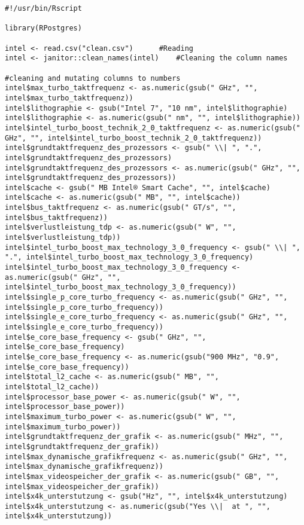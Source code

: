 \begin{lstlisting}[caption={\texttt{database.R}},captionpos=b]
#!/usr/bin/Rscript

library(RPostgres)

intel <- read.csv("clean.csv")		#Reading
intel <- janitor::clean_names(intel)	#Cleaning the column names

#cleaning and mutating columns to numbers
intel$max_turbo_taktfrequenz <- as.numeric(gsub(" GHz", "", intel$max_turbo_taktfrequenz))
intel$lithographie <- gsub("Intel 7", "10 nm", intel$lithographie)
intel$lithographie <- as.numeric(gsub(" nm", "", intel$lithographie))
intel$intel_turbo_boost_technik_2_0_taktfrequenz <- as.numeric(gsub(" GHz", "", intel$intel_turbo_boost_technik_2_0_taktfrequenz))
intel$grundtaktfrequenz_des_prozessors <- gsub(" \\| ", ".", intel$grundtaktfrequenz_des_prozessors)
intel$grundtaktfrequenz_des_prozessors <- as.numeric(gsub(" GHz", "", intel$grundtaktfrequenz_des_prozessors))
intel$cache <- gsub(" MB Intel® Smart Cache", "", intel$cache)
intel$cache <- as.numeric(gsub(" MB", "", intel$cache))
intel$bus_taktfrequenz <- as.numeric(gsub(" GT/s", "", intel$bus_taktfrequenz))
intel$verlustleistung_tdp <- as.numeric(gsub(" W", "", intel$verlustleistung_tdp))
intel$intel_turbo_boost_max_technology_3_0_frequency <- gsub(" \\| ", ".", intel$intel_turbo_boost_max_technology_3_0_frequency)
intel$intel_turbo_boost_max_technology_3_0_frequency <- as.numeric(gsub(" GHz", "", intel$intel_turbo_boost_max_technology_3_0_frequency))
intel$single_p_core_turbo_frequency <- as.numeric(gsub(" GHz", "", intel$single_p_core_turbo_frequency))
intel$single_e_core_turbo_frequency <- as.numeric(gsub(" GHz", "", intel$single_e_core_turbo_frequency))
intel$e_core_base_frequency <- gsub(" GHz", "", intel$e_core_base_frequency)
intel$e_core_base_frequency <- as.numeric(gsub("900 MHz", "0.9", intel$e_core_base_frequency))
intel$total_l2_cache <- as.numeric(gsub(" MB", "", intel$total_l2_cache))
intel$processor_base_power <- as.numeric(gsub(" W", "", intel$processor_base_power))
intel$maximum_turbo_power <- as.numeric(gsub(" W", "", intel$maximum_turbo_power))
intel$grundtaktfrequenz_der_grafik <- as.numeric(gsub(" MHz", "", intel$grundtaktfrequenz_der_grafik))
intel$max_dynamische_grafikfrequenz <- as.numeric(gsub(" GHz", "", intel$max_dynamische_grafikfrequenz))
intel$max_videospeicher_der_grafik <- as.numeric(gsub(" GB", "", intel$max_videospeicher_der_grafik))
intel$x4k_unterstutzung <- gsub("Hz", "", intel$x4k_unterstutzung)
intel$x4k_unterstutzung <- as.numeric(gsub("Yes \\|  at ", "", intel$x4k_unterstutzung))



\end{lstlisting}
